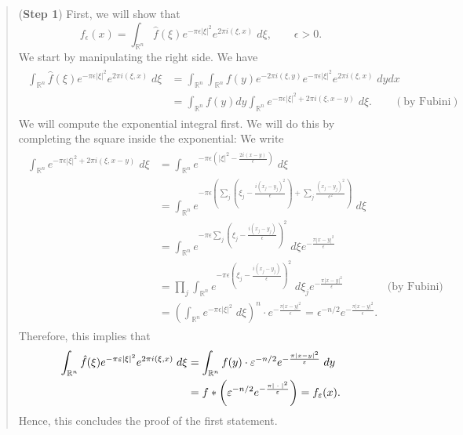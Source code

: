 \documentclass{article}
\begin{document}
\begin{itemize}
{		\begin{quote}
			(\textbf{Step 1}) First, we will show that 
			\begin{equation*}
				f_{\epsilon}(x) = \int_{\mathbb{R}^{n}}\hat{f}(\xi)e^{-\pi \epsilon |\xi|^{2}}e^{2\pi i (\xi, x)}\;d\xi, \qquad \epsilon >0. 
			\end{equation*}
			We start by manipulating the right side. We have 
			\begin{align}
				\begin{split}
					\int_{\mathbb{R}^{n}}\hat{f}(\xi)e^{-\pi \epsilon |\xi|^{2}}e^{2\pi i (\xi, x)}\;d\xi &= \int_{\mathbb{R}^{n}}\int_{\mathbb{R}^{n}}f(y)e^{-2\pi i (\xi, y)}e^{-\pi \epsilon |\xi|^{2}}e^{2\pi i (\xi, x)}\;dy dx \\
					&= \int_{\mathbb{R}^{n}}f(y)dy\int_{\mathbb{R}^{n}}e^{-\pi \epsilon |\xi|^{2} + 2\pi i (\xi, x - y)}\;d\xi. \qquad (\text{by Fubini})
				\end{split}
			\end{align}
			We will compute the exponential integral first. We will do this by completing the square inside the exponential: We write 
			\begin{align}
				\begin{split}
					\int_{\mathbb{R}^{n}}e^{-\pi \epsilon |\xi|^{2} + 2\pi i (\xi, x - y)}\;d\xi  &= \int_{\mathbb{R}^{n}}e^{-\pi \epsilon \left(|\xi|^{2} - \frac{2i(x - y)}{\epsilon}\right)}\;d\xi\\
					&= \int_{\mathbb{R}^{n}}e^{-\pi \epsilon \left(\sum_{j}\left(\xi_{j} - \frac{i(x_{j} - y_{j})^{2}}{\epsilon}\right) + \sum_{j} \frac{(x_{j} - y_{j})^{2}}{\epsilon^{2}}\right)}\;d\xi \\
					&= \int_{\mathbb{R}^{n}}e^{-\pi \epsilon \sum_{j}\left( \xi_{j} - \frac{ i(x_{j} - y_{j})}{\epsilon} \right)^{2}}\;d\xi e^{-\frac{\pi |x - y|^{2}}{\epsilon}} \\
					&= \prod_{j}\int_{\mathbb{R}^{n}}e^{-\pi \epsilon \left(\xi_{j} - \frac{ i(x_{j} - y_{j})}{\epsilon}\right)^{2}}\;d\xi_{j} e^{-\frac{\pi |x - y|^{2}}{\epsilon}} \qquad \qquad \text{(by Fubini)} \\
					&= \left(\int_{\mathbb{R}^{n}}e^{-\pi \epsilon |\xi|^{2}}\;d\xi\right)^{n} \cdot e^{-\frac{\pi |x - y|^{2}}{\epsilon}} = \epsilon^{-n/2}e^{-\frac{\pi|x - y|^{2}}{\epsilon}}. 
				\end{split}
			\end{align}
			Therefore, this implies that 
			\begin{align}
				\begin{split}
					\int_{\mathbb{R}^{n}}\hat{f}(\xi)e^{-\pi \varepsilon |\xi|^{2}}e^{2\pi i (\xi, x)}\;d\xi &= \int_{\mathbb{R}^{n}}f(y) \cdot \varepsilon^{-n/2}e^{-\frac{\pi |x - y|^{2}}{\varepsilon}}\;dy \\
					&= f \ast \left(\varepsilon^{-n/2}e^{-\frac{\pi |\hspace{2pt}\cdot\hspace{2pt}|^{2}}{\varepsilon}}\right) = f_{\varepsilon}(x). 
				\end{split}
			\end{align}
			Hence, this concludes the proof of the first statement. 
			

\end{quote}}
\end{itemize}
\end{document}
